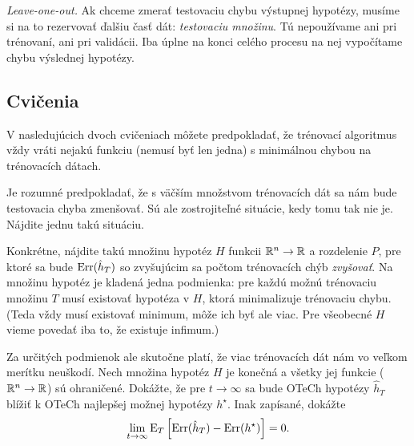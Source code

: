 \emph{Leave-one-out.} Ak chceme zmerať testovaciu chybu
výstupnej hypotézy, musíme si na to rezervovať ďalšiu časť dát:
\emph{testovaciu množinu}. Tú nepoužívame ani pri trénovaní, ani
pri validácii. Iba úplne na konci celého procesu na nej vypočítame
chybu výslednej hypotézy.




\subsection{Cvičenia}

V nasledujúcich dvoch cvičeniach môžete predpokladať, že trénovací
algoritmus vždy vráti nejakú funkciu (nemusí byť len jedna)
s minimálnou chybou na trénovacích dátach.

\begin{exercise}
  Je rozumné predpokladať, že s väčším množstvom trénovacích dát sa nám
  bude testovacia chyba zmenšovať. Sú ale zostrojiteľné situácie, kedy
  tomu tak nie je. Nájdite jednu takú situáciu.
  
  Konkrétne, nájdite takú množinu hypotéz $H$ funkcii $\mathbb{R}^n \to \mathbb{R}$
  a rozdelenie $P$, pre ktoré sa bude $\mathrm{Err}(\hat{h}_T)$ so zvyšujúcim
  sa počtom trénovacích chýb \emph{zvyšovať}. Na množinu hypotéz je
  kladená jedna podmienka: pre každú možnú trénovaciu množinu $T$
  musí existovať hypotéza v $H$, ktorá minimalizuje trénovaciu chybu.
  (Teda vždy musí existovať minimum, môže ich byť ale viac. Pre všeobecné
  $H$ vieme povedať iba to, že existuje infimum.)
\end{exercise}

\begin{exercise}
  Za určitých podmienok ale skutočne platí, že viac trénovacích dát
  nám vo veľkom merítku neuškodí. Nech množina hypotéz $H$ je konečná
  a všetky jej funkcie ($\mathbb{R}^n \to \mathbb{R}$) sú ohraničené. Dokážte, že
  pre $t \to \infty$ sa bude OTeCh hypotézy $\hat{h}_T$ blížiť k
  OTeCh najlepšej možnej hypotézy $h^\star$. Inak zapísané, dokážte
  $$\lim_{t \to \infty} \mathrm{E}_T \left[ \mathrm{Err}(\hat{h}_T) - \mathrm{Err}(h^\star) \right] = 0.$$
\end{exercise}

